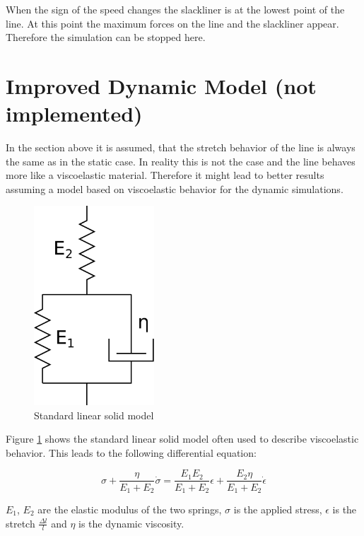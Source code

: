 When the sign of the speed changes the slackliner is at the lowest point of the line. At this point the maximum forces on the line and the slackliner appear. Therefore the simulation can be stopped here.

\section{Improved Dynamic Model (not implemented)}

In the section above it is assumed, that the stretch behavior of the line is always the same as in the static case. In reality this is not the case and the line behaves more like a viscoelastic material. Therefore it might lead to better results assuming a model based on viscoelastic behavior for the dynamic simulations.

\begin{figure}[htb] \centering
	\includegraphics[width=0.4\textwidth]{images/dynamicStandardModel.pdf}
	\caption{Standard linear solid model}
	\label{fig:dynamicStandardModel}
\end{figure}

Figure \ref{fig:dynamicStandardModel} shows the standard linear solid model often used to describe viscoelastic behavior. This leads to the following differential equation:

\begin{equation}
	\sigma + \frac{\eta}{E_1+E_2}\dot\sigma = \frac{E_1E_2}{E_1+E_2}\epsilon + \frac{E_2\eta}{E_1+E_2}\dot\epsilon
	\label{eqn:standardLinearModel}
\end{equation}

$E_1$, $E_2$ are the elastic modulus of the two springs, $\sigma$ is the applied stress, $\epsilon$ is the stretch $\frac{\Delta l}{l}$ and $\eta$ is the dynamic viscosity. 

